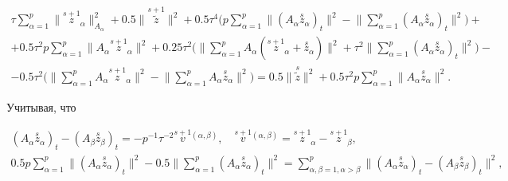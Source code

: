 \begin{multline}


\tau\sum\limits_{\alpha=1}^p \|


\overset {s+1}{z}_{\!\!\!\alpha}\|^2_{A_\alpha}+ 


0.5\|\overset {s+1}{\widetilde z}\|^2 + 0.5\tau^4


\bigg(p \sum\limits_{\alpha=1}^p \|(A_\alpha


\overset{s}{z}{}_\alpha)_t\|^2- \bigg\|\sum\limits_{\alpha=1}^p (A_\alpha 


\overset{s}{z}{}_\alpha)_t\bigg\|^2 \bigg)+  \\


%


+0.5\tau^2 p\sum\limits_{\alpha=1}^p \|A_\alpha


\overset {s+1}{z}_{\!\!\!\alpha}\|^2+


0.25\tau^2\bigg(\bigg\|\sum\limits_{\alpha=1}^p A_\alpha 


(\overset{s+1}{z}_{\!\!\!\alpha} +\overset{s}{z}{}_\alpha)\bigg\|^2 + 


\tau^2\bigg\|\sum\limits_{\alpha=1}^p


(A_\alpha\overset{s}{z}{}_\alpha)_t\bigg\|^2\bigg)- \\


%


-0.5\tau^2\bigg(\bigg\|\sum_{\alpha=1}^p A_\alpha


\overset{s+1}{z}_{\!\!\!\alpha}


\bigg\|^2-\bigg\|\sum\limits_{\alpha=1}^p


A_\alpha\overset{s}{z}{}_\alpha\bigg\|^2\bigg) = 


0.5\|\overset {s}{\widetilde z} \|^2 +0.5\tau^2 p \sum\limits_{\alpha=1}^p 


\|A_\alpha \overset{s}{z}{}_\alpha\|^2.


\end{multline}


Учитывая, что


\begin{gather*}


(A_\alpha \overset{s}{z}{}_\alpha)_t - (A_\beta \overset{s}{z}{}_\beta)_t = 


-p^{-1} \tau^{-2}\overset{s+1}{v}{}^{(\alpha,\beta)},\quad 


\overset{s+1}{v}{}^{(\alpha,\beta)} =\overset{s+1}{z}_{\!\!\!\alpha} -


\overset{s+1}{z}_{\!\!\beta}, \\


%


0.5p \sum\limits_{\alpha=1}^p \|(A_\alpha\overset{s}{z}{}_\alpha)_t\|^2- 


0.5\bigg\|\sum\limits_{\alpha=1}^p


(A_\alpha \overset{s}{z}{}_\alpha)_t\bigg\|^2 =


\sum\limits_{\alpha,\beta=1,\alpha > \beta}^p


\|(A_\alpha \overset{s}{z}{}_\alpha)_t


-(A_\beta \overset{s}{z}{}_\beta)_t\|^2,


\end{gather*}


